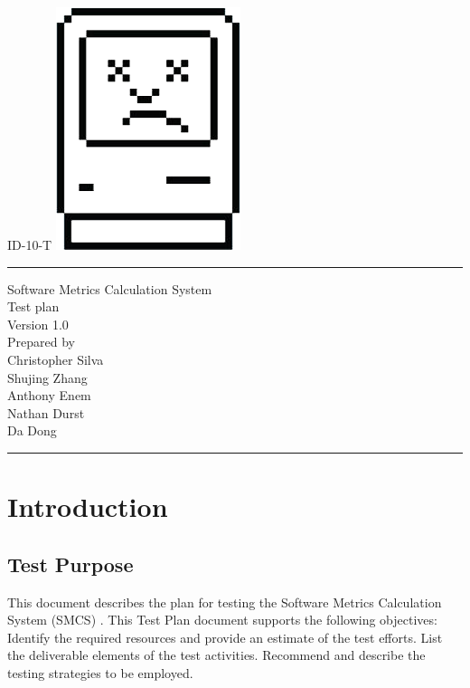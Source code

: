 \documentclass{scrreprt}
\author{Christopher Silva}
\date{}
\def\myversion{1.0 }
\begin{document}
	\begin{titlepage}
		\flushright
		\LARGE{ID-10-T}
		\includegraphics[scale=0.08]{logo.png}
		\rule{16cm}{5pt}\vskip1cm
		\centering
		\Huge{Software Metrics Calculation System}\\
		\vspace{2cm}
		\Huge{Test plan}\\
		\vspace{2cm}
		\LARGE{Version \myversion\\}
		\vspace{2cm}
		Prepared by\\
	    Christopher Silva\\
	    Shujing Zhang\\
		Anthony Enem\\
		Nathan Durst\\
		Da Dong\\
		\vfill
		\rule{16cm}{5pt}
	\end{titlepage}
	\tableofcontents
	\chapter{Introduction}
	
	\section{Test Purpose}
	This document describes the plan for testing the Software Metrics Calculation System (SMCS) . This Test Plan document supports the following objectives:
	Identify the required resources and provide an estimate of the test efforts.
	List the deliverable elements of the test activities.
	Recommend and describe the testing strategies to be employed.
\end{document}
